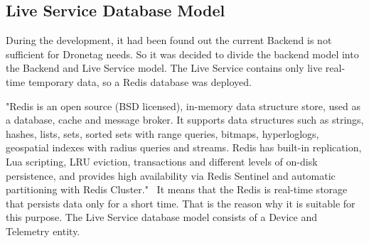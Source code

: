 \subsection{Live Service Database Model}\label{subsec:live-service-database-model}
During the development, it had been found out the current Backend is not sufficient for Dronetag needs.
So it was decided to divide the backend model into the Backend and Live Service model.
The Live Service contains only live real-time temporary data, so a Redis database was deployed.

"Redis is an open source (BSD licensed), in-memory data structure store, used as a database, cache and message broker.
It supports data structures such as strings, hashes, lists, sets, sorted sets with range queries, bitmaps, hyperloglogs, geospatial indexes with radius queries and streams.
Redis has built-in replication, Lua scripting, LRU eviction, transactions and different levels of on-disk persistence, and provides high availability via Redis Sentinel and automatic partitioning with Redis Cluster."~\cite{redis}
It means that the Redis is real-time storage that persists data only for a short time.
That is the reason why it is suitable for this purpose.
The Live Service database model consists of a Device and Telemetry entity.

